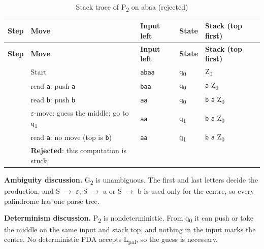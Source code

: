 \documentclass[12pt,a4paper]{article}
\begin{document}
{\footnotesize
\begin{longtable}{|>{\centering\arraybackslash}p{}|>{\raggedright\arraybackslash}p{}|>{\raggedright\arraybackslash}p{}|>{\centering\arraybackslash}p{}|>{\raggedright\arraybackslash}p{}|}
\caption[Stack trace of P2 on abaa (rejected)]{Stack trace of P\textsubscript{2} on abaa (rejected)}\label{tab:pal_tr2}\\
\hline
\rowcolor{hdr}\textbf{Step} & \textbf{Move} & \textbf{Input left} & \textbf{State} & \textbf{Stack (top first)}\\ \hline
\endfirsthead
\hline
\rowcolor{hdr}\textbf{Step} & \textbf{Move} & \textbf{Input left} & \textbf{State} & \textbf{Stack (top first)}\\ \hline
\endhead
0 & Start & \texttt{abaa} & q\textsubscript{0} & Z\textsubscript{0}\\ \hline
1 & read \texttt{a}: push \texttt{a} & \texttt{baa} & q\textsubscript{0} & \texttt{a}  Z\textsubscript{0}\\ \hline
2 & read \texttt{b}: push \texttt{b} & \texttt{aa} & q\textsubscript{0} & \texttt{b}  \texttt{a}  Z\textsubscript{0}\\ \hline
3 & \ensuremath{\varepsilon}-move: guess the middle; go to q\textsubscript{1} & \texttt{aa} & q\textsubscript{1} & \texttt{b}  \texttt{a}  Z\textsubscript{0}\\ \hline
4 & read \texttt{a}: no move (top is \texttt{b}) & \texttt{aa} & q\textsubscript{1} & \texttt{b}  \texttt{a}  Z\textsubscript{0}\\ \hline
 & \textbf{Rejected}: this computation is stuck &  &  & \\ \hline
\end{longtable}}

\textbf{Ambiguity discussion.} G\textsubscript{2} is unambiguous. The first and last letters decide the production, and S \ensuremath{\rightarrow} \ensuremath{\varepsilon}, S \ensuremath{\rightarrow} a or S \ensuremath{\rightarrow} b is used only for the centre, so every palindrome has one parse tree.

\textbf{Determinism discussion.} P\textsubscript{2} is nondeterministic. From q\textsubscript{0} it can push or take the middle on the same input and stack top, and nothing in the input marks the centre. No deterministic PDA accepts L\textsubscript{pal}, so the guess is necessary.
\end{document}
